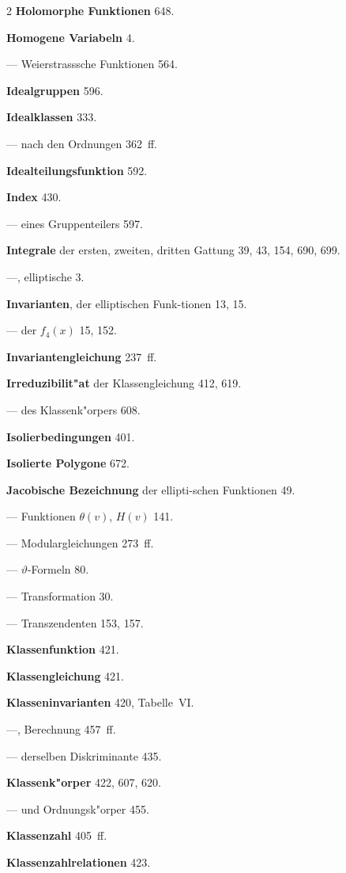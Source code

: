 \documentclass[12pt,a4paper]{article}
\begin{document}
\begin{multicols}{2}
\textbf{Holomorphe Funktionen} 648.

\textbf{Homogene Variabeln} 4.

--- Weierstrasssche Funktionen 564.

\bigskip

\textbf{Idealgruppen} 596.

\textbf{Idealklassen} 333.

--- nach den Ordnungen 362~ff.

\textbf{Idealteilungsfunktion} 592.

\textbf{Index} 430.

--- eines Gruppenteilers 597.

\textbf{Integrale} der ersten, zweiten, dritten Gattung 39, 43, 154, 690, 699.

---, elliptische 3.

\textbf{Invarianten}, der elliptischen Funk{-}tionen 13, 15.

--- der $f_4(x)$ 15, 152.

\textbf{Invariantengleichung} 237~ff.

\textbf{Irreduzibilit"at} der Klassengleichung 412, 619.

--- des Klassenk"orpers 608.

\textbf{Isolierbedingungen} 401.

\textbf{Isolierte Polygone} 672.

\bigskip

\textbf{Jacobische Bezeichnung} der ellipti{-}schen Funktionen 49.

--- Funktionen $\theta(v)$, $H(v)$ 141.

--- Modulargleichungen 273~ff.

--- $\vartheta$-Formeln 80.

--- Transformation 30.

--- Transzendenten 153, 157.

\bigskip

\textbf{Klassenfunktion} 421.

\textbf{Klassengleichung} 421.

\textbf{Klasseninvarianten} 420, Tabelle~VI.

---, Berechnung 457~ff.

--- derselben Diskriminante 435.

\textbf{Klassenk"orper} 422, 607, 620.

--- und Ordnungsk"orper 455.

\textbf{Klassenzahl} 405~ff.

\textbf{Klassenzahlrelationen} 423.


\end{multicols}
\end{document}
